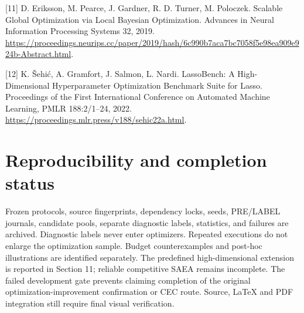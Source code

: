 \documentclass[11pt,a4paper]{article}
\begin{document}
{[}11{]} D. Eriksson, M. Pearce, J. Gardner, R. D. Turner, M. Poloczek.
Scalable Global Optimization via Local Bayesian Optimization. Advances
in Neural Information Processing Systems 32, 2019.
\url{https://proceedings.neurips.cc/paper/2019/hash/6c990b7aca7bc7058f5e98ea909e924b-Abstract.html}.

{[}12{]} K. Šehić, A. Gramfort, J. Salmon, L. Nardi. LassoBench: A
High-Dimensional Hyperparameter Optimization Benchmark Suite for Lasso.
Proceedings of the First International Conference on Automated Machine
Learning, PMLR 188:2/1--24, 2022.
\url{https://proceedings.mlr.press/v188/sehic22a.html}.

\hypertarget{reproducibility-and-completion-status}{%
\section{Reproducibility and completion
status}\label{reproducibility-and-completion-status}}

Frozen protocols, source fingerprints, dependency locks, seeds,
PRE/LABEL journals, candidate pools, separate diagnostic labels,
statistics, and failures are archived. Diagnostic labels never enter
optimizers. Repeated executions do not enlarge the optimization sample.
Budget counterexamples and post-hoc illustrations are identified
separately. The predefined high-dimensional extension is reported in
Section 11; reliable competitive SAEA remains incomplete. The failed
development gate prevents claiming completion of the original
optimization-improvement confirmation or CEC route. Source, LaTeX and
PDF integration still require final visual verification.
\end{document}
